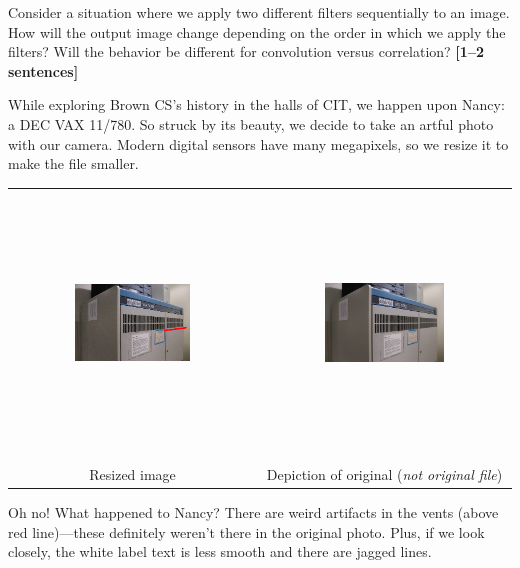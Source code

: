 \documentclass{csci1430}
\begin{document}
\pagebreak

\begin{subquestion}[points=1]
Consider a situation where we apply two different filters sequentially to an image. How will the output image change depending on the order in which we apply the filters? Will the behavior be different for convolution versus correlation? \textbf{[1--2 sentences]}
\end{subquestion}

\begin{answer}[height=14]
    
\end{answer}

\pagebreak %

\begin{question}[points=6,drawbox=false]
While exploring Brown CS's history in the halls of CIT, we happen upon Nancy: a DEC VAX 11/780. So struck by its beauty, we decide to take an artful photo with our camera. Modern digital sensors have many megapixels, so we resize it to make the file smaller.

\begin{tabular}{c c}
\includegraphics[width=0.49\textwidth,height=7cm,keepaspectratio]{images/poor_nancy_markup.png} &
\includegraphics[width=0.49\textwidth,height=7cm,keepaspectratio]{images/poor_nancy_better.png} \\
Resized image & Depiction of original (\emph{not original file})
\end{tabular}

Oh no! What happened to Nancy? There are weird artifacts in the vents (above red line)---these definitely weren't there in the original photo. Plus, if we look closely, the white label text is less smooth and there are jagged lines.
\end{question}
\end{document}
